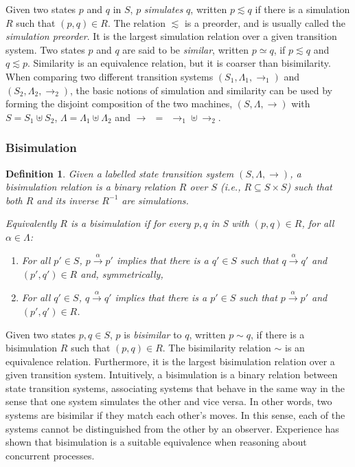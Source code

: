 \documentclass[10pt,a4paper]{article}
\newcommand{\tran}[3]{#1 \overset{#2}{\longrightarrow} #3}
\newtheorem{definition}{Definition}
\begin{document}
Given two states $p$ and $q$ in $S$, $p$ \emph{simulates} $q$, written $p \lesssim q$ if there is a simulation $R$ such that $(p, q) \in R$. The relation $\lesssim$ is a preorder, and is usually called the \emph{simulation preorder}. It is the largest simulation relation over a given transition system. Two states $p$ and $q$ are said to be \emph{similar}, written $p \simeq q$, if $p \lesssim q$ and $q \lesssim p$. Similarity is an equivalence relation, but it is coarser than bisimilarity. When comparing two different transition systems $(S_1, \Lambda_1, \rightarrow_1)$ and $(S_2, \Lambda_2, \rightarrow_2)$, the basic notions of simulation and similarity can be used by forming the disjoint composition of the two machines, $(S, \Lambda, \rightarrow)$ with $S = S_1 \uplus S_2$, $\Lambda = \Lambda_1 \uplus \Lambda_2$ and $\rightarrow \:\: = \:\: \rightarrow_1 \uplus \rightarrow_2$.

\subsubsection{Bisimulation}

\begin{definition}
Given a labelled state transition system $(S, \Lambda, \rightarrow)$, a \textnormal{bisimulation} relation is a binary relation $R$ over $S$ (i.e., $R \subseteq S \times S$) such that both $R$ and its inverse $R^{-1}$ are simulations. 

Equivalently $R$ is a bisimulation if for every $p, q$ in S with $(p,q) \in R$, for all $\alpha \in \Lambda$:
\begin{enumerate}
\item For all $p' \in S$, $\tran{p}{\alpha}{p'}$ implies that there is a $q' \in S$ such that $\tran{q}{\alpha}{q'}$ and $(p',q') \in R$ and, symmetrically,
\item For all $q' \in S$, $\tran{q}{\alpha}{q'}$ implies that there is a $p' \in S$ such that $\tran{p}{\alpha}{p'}$ and $(p',q') \in R$.
\end{enumerate}
\end{definition}

Given two states $p, q \in S$, $p$ is \emph{bisimilar} to $q$, written $p \sim q$, if there is a bisimulation $R$ such that $(p, q) \in R$. The bisimilarity relation $\sim$ is an equivalence relation. Furthermore, it is the largest bisimulation relation over a given transition system. Intuitively, a bisimulation is a binary relation between state transition systems, associating systems that behave in the same way in the sense that one system simulates the other and vice versa. In other words, two systems are bisimilar if they match each other's moves. In this sense, each of the systems cannot be distinguished from the other by an observer. Experience has shown that bisimulation is a suitable equivalence when reasoning about concurrent processes.
\end{document}
